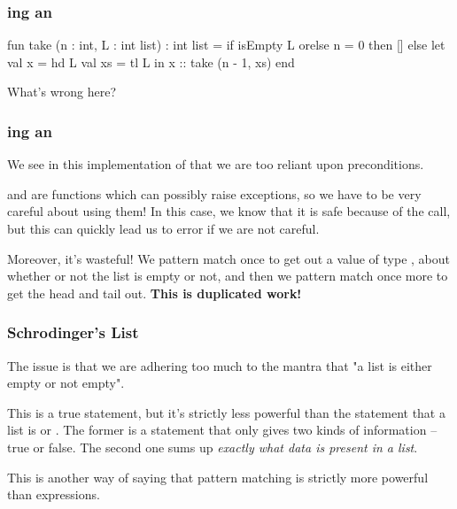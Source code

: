\documentclass[aspectratio=169]{beamer}
\begin{document}
\begin{frame}[fragile]
  \frametitle{ing an }

  \begin{codeblock}
    fun take (n : int, L : int list) : int list =
      if isEmpty L orelse n = 0 then
        []
      else
        let
          val x = hd L
          val xs = tl L
        in
          x :: take (n - 1, xs)
        end
  \end{codeblock}

  \pause
  \vspace{\fill}

  What's wrong here?
\end{frame}

\begin{frame}[fragile]
  \frametitle{ing an }

  We see in this implementation of  that we are too reliant
  upon preconditions.

  \pause
  \vspace{\fill}

   and  are functions which can possibly raise exceptions,
  so we have to be very careful about using them! In this case, we know that
  it is safe because of the  call, but this can quickly lead
  us to error if we are not careful.

  \pause
  \vspace{\fill}

  Moreover, it's wasteful! We pattern match once to get out a value of type
  , about whether or not the list is empty or not, and then we
  pattern match once more to get the head and tail out. \textbf{This is duplicated
  work!}
\end{frame}

\begin{frame}[fragile]
  \frametitle{Schrodinger's List}

  The issue is that we are adhering too much to the mantra that "a list is
  either empty or not empty".

  \pause
  \vspace{\fill}

  This is a true statement, but it's strictly less powerful than the statement
  that a list is \code{[]} or . The former is a statement that only
  gives two kinds of information -- true or false. The second one sums up
  \textit{exactly what data is present in a list}.

  \pause
  \vspace{\fill}

  This is another way of saying that pattern matching is strictly more powerful
  than  expressions.
\end{frame}
\end{document}
